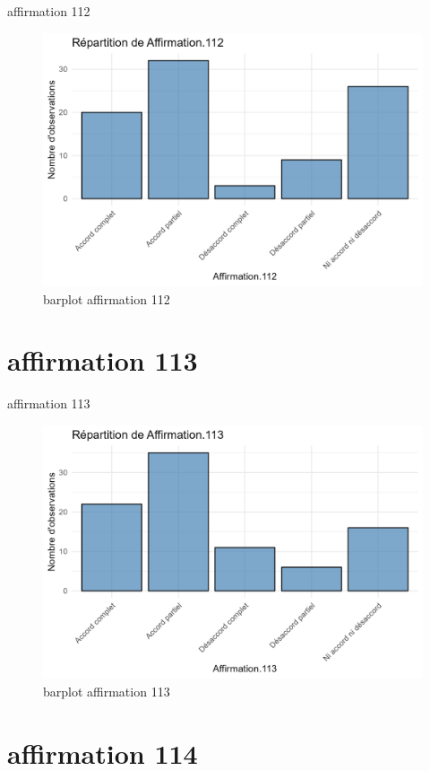 \documentclass[
]{article}
\begin{document}
affirmation 112

\begin{figure}
\centering
\includegraphics{Image/barplot_Affirmation.112.png}
\caption{barplot affirmation 112}
\end{figure}

\section{affirmation 113}\label{affirmation-113}

affirmation 113

\begin{figure}
\centering
\includegraphics{Image/barplot_Affirmation.113.png}
\caption{barplot affirmation 113}
\end{figure}

\section{affirmation 114}\label{affirmation-114}
\end{document}
